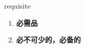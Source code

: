 
\begin{frame}
{\huge requisite}
\begin{center}
\begin{enumerate}\Large
  \item \textbf{必需品}
  \item \textbf{必不可少的，必备的}
\end{enumerate}
\end{center}
\end{frame}
